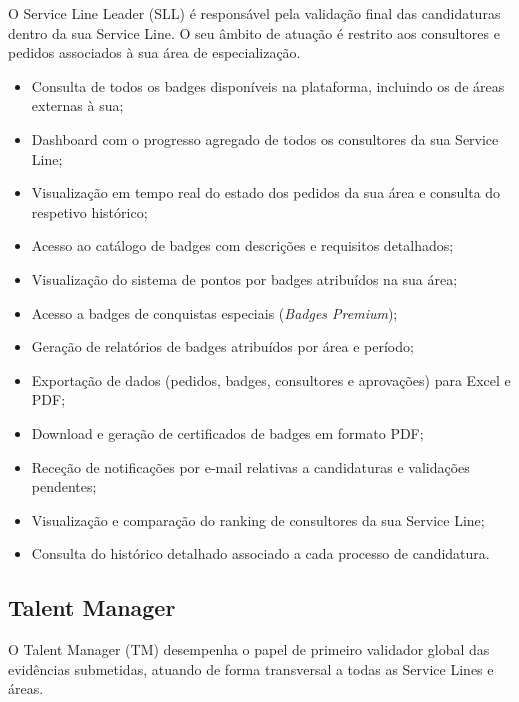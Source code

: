 \documentclass[12pt,a4paper]{report}
\begin{document}
O Service Line Leader (SLL) é responsável pela validação final das candidaturas dentro da sua Service Line. O seu âmbito de atuação é restrito aos consultores e pedidos associados à sua área de especialização.

\begin{itemize}
  \item Consulta de todos os badges disponíveis na plataforma, incluindo os de áreas externas à sua;
  \item Dashboard com o progresso agregado de todos os consultores da sua Service Line;
  \item Visualização em tempo real do estado dos pedidos da sua área e consulta do respetivo histórico;
  \item Acesso ao catálogo de badges com descrições e requisitos detalhados;
  \item Visualização do sistema de pontos por badges atribuídos na sua área;
  \item Acesso a badges de conquistas especiais (\textit{Badges Premium});
  \item Geração de relatórios de badges atribuídos por área e período;
  \item Exportação de dados (pedidos, badges, consultores e aprovações) para Excel e PDF;
  \item Download e geração de certificados de badges em formato PDF;
  \item Receção de notificações por e-mail relativas a candidaturas e validações pendentes;
  \item Visualização e comparação do ranking de consultores da sua Service Line;
  \item Consulta do histórico detalhado associado a cada processo de candidatura.
\end{itemize}

\subsection{Talent Manager}

O Talent Manager (TM) desempenha o papel de primeiro validador global das evidências submetidas, atuando de forma transversal a todas as Service Lines e áreas.
\end{document}
